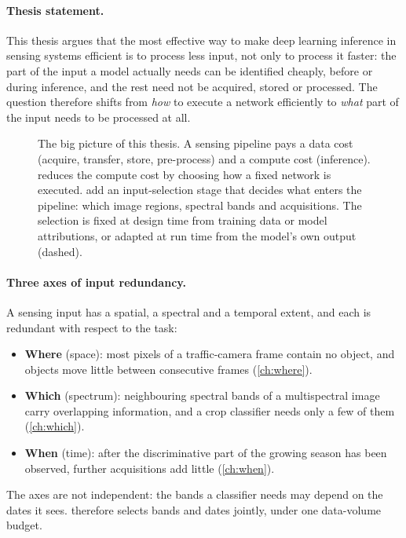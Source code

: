 \paragraph{Thesis statement.}
This thesis argues that the most effective way to make deep learning inference
in sensing systems efficient is to process less input, not only to process it
faster: the part of the input a model actually needs can be identified
cheaply, before or during inference, and the rest need not be acquired, stored
or processed. The question therefore shifts from \emph{how} to execute a
network efficiently to \emph{what} part of the input needs to be processed at
all.

\begin{figure}[t]
  \centering
  
  \caption{The big picture of this thesis. A sensing pipeline pays a data cost
  (acquire, transfer, store, pre-process) and a compute cost (inference).
   reduces the compute cost by choosing how a fixed network is
  executed.  add an input-selection
  stage that decides what enters the pipeline: which image regions, spectral
  bands and acquisitions. The selection is fixed at design time from training
  data or model attributions, or adapted at run time from the model's own
  output (dashed).}
  \label{fig:intro:bigpicture}
\end{figure}

\paragraph{Three axes of input redundancy.}
A sensing input has a spatial, a spectral and a temporal extent, and each is
redundant with respect to the task:
\begin{itemize}
  \item \textbf{Where} (space): most pixels of a traffic-camera frame contain no
  object, and objects move little between consecutive frames (\cref{ch:where}).
  \item \textbf{Which} (spectrum): neighbouring spectral bands of a
  multispectral image carry overlapping information, and a crop classifier needs
  only a few of them (\cref{ch:which}).
  \item \textbf{When} (time): after the discriminative part of the growing season
  has been observed, further acquisitions add little (\cref{ch:when}).
\end{itemize}
The axes are not independent: the bands a classifier needs may depend on the
dates it sees.  therefore selects bands and dates jointly, under
one data-volume budget.

